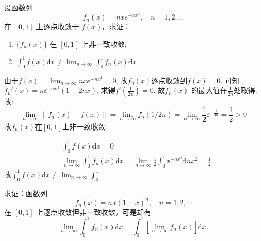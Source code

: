 \begin{problem}
    设函数列\[
        f_n(x) = nx e^{-nx^2} , \quad n = 1, 2, \ldots
    \]
    在 \([0, 1]\) 上逐点收敛于 \(f(x)\)，求证：
    \begin{enumerate}
        \item \(\{f_n(x)\}\) 在 \([0, 1]\) 上非一致收敛;
        \item \(\int_{0}^{1} f(x) \mathrm{d}x \neq \lim_{n \to \infty}
            \int_{0}^{1} f_n(x) \mathrm{d}x\)
    \end{enumerate}
\end{problem}

\begin{solution}
    由于\(f(x) = \lim_{n \to \infty} nx e^{-nx^2} = 0\),
    故\(f_{n}(x)\)逐点收敛到\(f(x) = 0\).
    可知\(f_{n}'(x) = n \ee^{-nx^{2}}(1-2nx)\), 求得\(f'\left(
    \frac{1}{2n} \right) = 0\). 故\(f_{n}(x)\) 的最大值在\(\frac{1}{2n}\)处取得.
    故:
    \[
        \lim_{n \to \infty} \left\lVert f_{n}(x) - f(x) \right\rVert
        = \lim_{n \to \infty} f_{n}(1/2n) = \lim_{n \to \infty}
        \frac{1}{2} \ee^{-\frac{1}{4n}} = \frac{1}{2} >  0
    \]
    故\(f_{n}(x)\)在\([0,1]\)上非一致收敛.

    \begin{align*}
        & \int_{0}^{1} f(x) \mathrm{d}x = 0                       \\
        & \lim_{n \to \infty} \int_{0}^{1} f_{n}(x) \mathrm{d}x =
        \lim_{n \to \infty} \frac{1}{2}\int_{0}^{1}
        \ee^{-nx^{2}} \mathrm{d}nx^{2} = \frac{1}{2}
    \end{align*}
    故\(\int_{0}^{1} f(x) \mathrm{d}x \neq \lim_{n \to \infty} \int_{0}^{1}\)

\end{solution}

\begin{problem}
    求证：函数列
    \[
        f_n(x) = nx(1-x)^n, \quad n = 1, 2, \cdots
    \]
    在 \([0, 1]\) 上逐点收敛但非一致收敛，可是却有
    \[
        \lim_{n \to \infty} \int_0^1 f_n(x) \mathrm{d}x = \int_0^1 \left[
        \lim_{n \to \infty} f_n(x) \right] \mathrm{d}x.
    \]
\end{problem}


